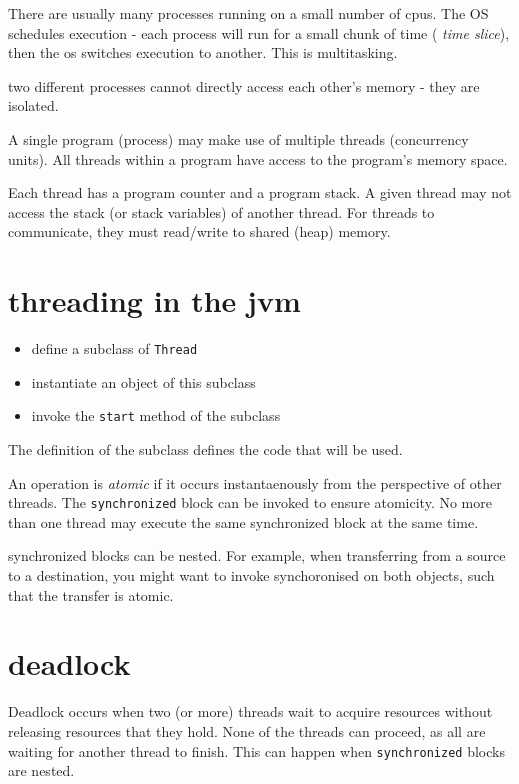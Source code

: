 There are usually many processes running on a small number of cpus. The OS schedules execution - each process will run for a small chunk of time ( {\em time slice}), then the os switches execution to another. This is multitasking.

two different processes cannot directly access each other's memory - they are isolated.

A single program (process) may make use of multiple threads (concurrency units). All threads within a program have access to the program's memory space.

Each thread has a program counter and a program stack. A given thread may not access the stack (or stack variables) of another thread. For threads to communicate, they must read/write to shared (heap) memory.

\section{threading in the jvm}

\begin{itemize}
    \item define a subclass of \lstinline|Thread|
    \item instantiate an object of this subclass
    \item invoke the \lstinline|start| method of the subclass
\end{itemize}

The definition of the subclass defines the code that will be used. 

An operation is {\em atomic} if it occurs instantaenously from the perspective of other threads.
The \lstinline|synchronized| block can be invoked to ensure atomicity. No more than one thread may execute the same synchronized block at the same time.

synchronized blocks can be nested. For example, when transferring from a source to a destination, you might want to invoke synchoronised on both objects, such that the transfer is atomic.

\section{deadlock}
Deadlock occurs when two (or more) threads wait to acquire resources without releasing resources that they hold. None of the threads can proceed, as all are waiting for another thread to finish. This can happen when \lstinline|synchronized| blocks are nested.

